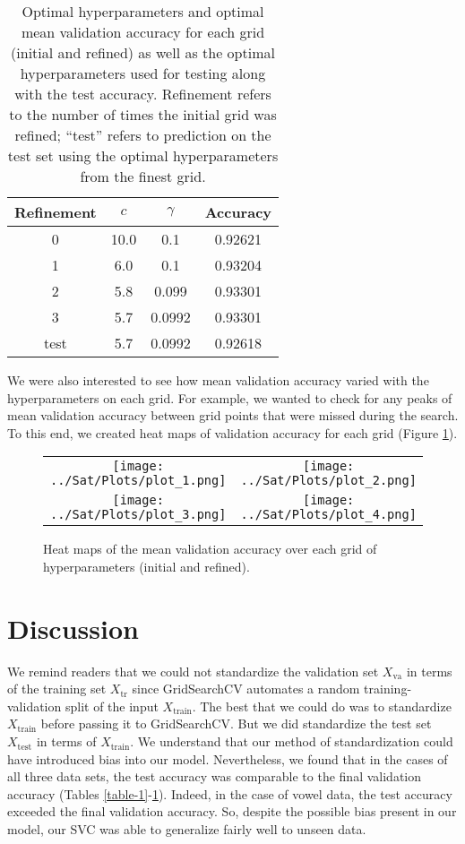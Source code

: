\documentclass[12pt]{article}
\newcommand{\Xtrain}{X_{\mbox{train}}}
\newcommand{\Xtest}{X_{\mbox{test}}}
\newcommand{\Xtr}{X_{\mbox{tr}}}
\newcommand{\Xva}{X_{\mbox{va}}}
\begin{document}
\begin{table}
\centering
\begin{tabular}{|c|c|c|c|} \hline
Refinement & $c$ & $\gamma$ & Accuracy \\ \hline
0 &  10.0 &  0.1 & 0.92621 \\
1 &  6.0 &  0.1 & 0.93204 \\
2 &  5.8 &  0.099 & 0.93301 \\
3 &  5.7 &  0.0992 & 0.93301 \\
test &  5.7 &  0.0992 & 0.92618 \\
\hline
\end{tabular}
\caption{\label{table-3} Optimal hyperparameters and optimal mean validation accuracy for each grid (initial and refined) as well as the optimal hyperparameters used for testing along with the test accuracy. Refinement refers to the number of times the initial grid was refined; ``test'' refers to prediction on the test set using the optimal hyperparameters from the finest grid.}
\end{table}

We were also interested to see how mean validation accuracy varied with the hyperparameters on each grid. For example, we wanted to check for any peaks of mean validation accuracy between grid points that were missed during the search. To this end, we created heat maps of validation accuracy for each grid (Figure \ref{figure-3}).

\begin{figure}
\centering
\begin{tabular}{cc}
\texttt{[image: ../Sat/Plots/plot\_1.png]} & 
\texttt{[image: ../Sat/Plots/plot\_2.png]} \\
\texttt{[image: ../Sat/Plots/plot\_3.png]} & 
\texttt{[image: ../Sat/Plots/plot\_4.png]}
\end{tabular}
\caption{\label{figure-3} Heat maps of the mean validation accuracy over each grid of hyperparameters (initial and refined).}
\end{figure}


\section{Discussion}

We remind readers that we could not standardize the validation set $\Xva$ in terms of the training set $\Xtr$ since GridSearchCV automates a random training-validation split of the input $\Xtrain$. The best that we could do was to standardize $\Xtrain$ before passing it to GridSearchCV. But we did standardize the test set $\Xtest$ in terms of $\Xtrain$. We understand that our method of standardization could have introduced bias into our model. Nevertheless, we found that in the cases of all three data sets, the test accuracy was comparable to the final validation accuracy (Tables \ref{table-1}-\ref{table-3}). Indeed, in the case of vowel data, the test accuracy exceeded the final validation accuracy. So, despite the possible bias present in our model, our SVC was able to generalize fairly well to unseen data.
\end{document}
